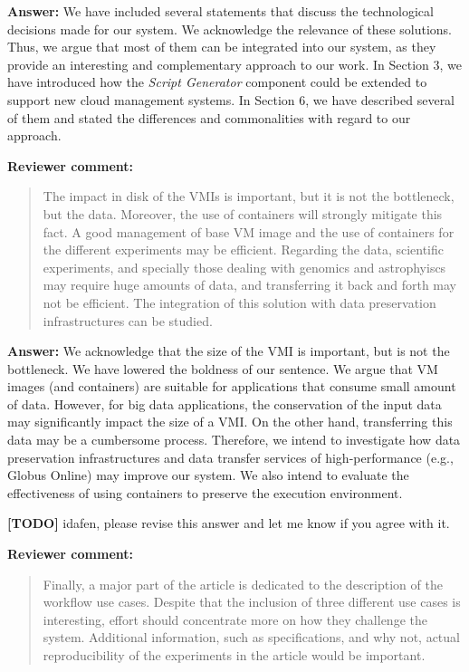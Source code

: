 \documentclass{letter}
\newenvironment{review}%
{\textbf{Reviewer comment:}\begin{quote}}%
{\end{quote}}%
\newcommand{\todo}[1]{%
      \color{red}\textbf{[TODO]} #1\color{black}}
\newcommand{\answer}[1]{%
      \textbf{Answer:} #1}
\begin{document}
\begin{letter}{}
\answer{We have included several statements that discuss the technological decisions made for our system. We acknowledge the relevance of these solutions. Thus, we argue that most of them can be integrated into our system, as they provide an interesting and complementary approach to our work. In Section 3, we have introduced how the {\it Script Generator} component could be extended to support new cloud management systems. In Section 6, we have described several of them and stated the differences and commonalities with regard to our approach.}


\begin{review}
The impact in disk of the VMIs is important, but it is not the bottleneck, but the data. Moreover, the use of containers will strongly mitigate this fact. A good management of base VM image and the use of containers for the different experiments may be efficient. Regarding the data, scientific experiments, and specially those dealing with genomics and astrophyiscs may require huge amounts of data, and transferring it back and forth may not be efficient. The integration of this solution with data preservation infrastructures can be studied.
\end{review}

\answer{We acknowledge that the size of the VMI is important, but is not the bottleneck. We have lowered the boldness of our sentence. We argue that VM images (and containers) are suitable for applications that consume small amount of data. However, for big data applications, the conservation of the input data may significantly impact the size of a VMI. On the other hand, transferring this data may be a cumbersome process. Therefore, we intend to investigate how data preservation infrastructures and data transfer services of high-performance (e.g., Globus Online) may improve our system. We also intend to evaluate the effectiveness of using containers to preserve the execution environment.

\todo{idafen, please revise this answer and let me know if you agree with it.}}


\begin{review}
Finally, a major part of the article is dedicated to the description of the workflow use cases. Despite that the inclusion of three different use cases is interesting, effort should concentrate more on how they challenge the system. Additional information, such as specifications, and why not, actual reproducibility of the experiments in the article would be important.
\end{review}


\end{letter}
\end{document}
